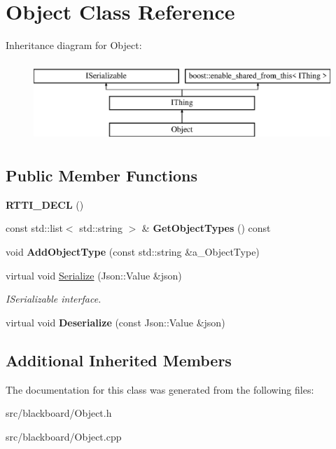 \hypertarget{class_object}{}\section{Object Class Reference}
\label{class_object}
Inheritance diagram for Object\+:\begin{figure}[H]
\begin{center}
\leavevmode
\includegraphics[height=3.000000cm]{class_object}
\end{center}
\end{figure}
\subsection*{Public Member Functions}
\begin{DoxyCompactItemize}
\item 
\mbox{\label{class_object_aa8ec869482d00db0f39f5f38c8c6e824}} 
{\bfseries R\+T\+T\+I\+\_\+\+D\+E\+CL} ()
\item 
\mbox{\label{class_object_a88bce3fb1001d5dce9ce33154696210f}} 
const std\+::list$<$ std\+::string $>$ \& {\bfseries Get\+Object\+Types} () const
\item 
\mbox{\label{class_object_aec371e66b8edb379f686d68e517c44b5}} 
void {\bfseries Add\+Object\+Type} (const std\+::string \&a\+\_\+\+Object\+Type)
\item 
\mbox{\label{class_object_a15a5087180f4e8f1797b2a8d30fbbe76}} 
virtual void \hyperlink{class_object_a15a5087180f4e8f1797b2a8d30fbbe76}{Serialize} (Json\+::\+Value \&json)
\begin{DoxyCompactList}\small\item\em I\+Serializable interface. \end{DoxyCompactList}\item 
\mbox{\label{class_object_ae4031b9f53571926211d18744ed9edb8}} 
virtual void {\bfseries Deserialize} (const Json\+::\+Value \&json)
\end{DoxyCompactItemize}
\subsection*{Additional Inherited Members}


The documentation for this class was generated from the following files\+:\begin{DoxyCompactItemize}
\item 
src/blackboard/Object.\+h\item 
src/blackboard/Object.\+cpp\end{DoxyCompactItemize}
